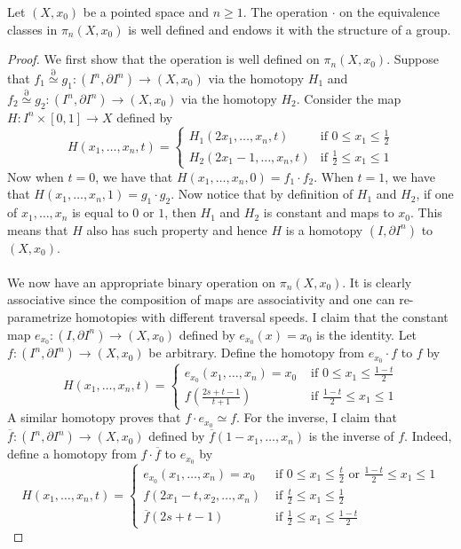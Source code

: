 \documentclass[a4paper]{article}
\begin{document}
\begin{thm}{}{} Let $(X,x_0)$ be a pointed space and $n\geq 1$. The operation $\cdot$ on the equivalence classes in $\pi_n(X,x_0)$ is well defined and endows it with the structure of a group. \tcbline
\begin{proof}
We first show that the operation is well defined on $\pi_n(X,x_0)$. Suppose that $f_1\overset{\partial}{\simeq} g_1:(I^n,\partial I^n)\to(X,x_0)$ via the homotopy $H_1$ and $f_2\overset{\partial}{\simeq} g_2:(I^n,\partial I^n)\to(X,x_0)$ via the homotopy $H_2$. Consider the map $H:I^n\times[0,1]\to X$ defined by $$H(x_1,\dots,x_n,t)=\begin{cases}
H_1(2x_1,\dots,x_n,t) & \text{if } 0\leq x_1\leq\frac{1}{2}\\
H_2(2x_1-1,\dots,x_n,t) & \text{if }\frac{1}{2}\leq x_1\leq 1
\end{cases}$$ 
Now when $t=0$, we have that $H(x_1,\dots,x_n,0)=f_1\cdot f_2$. When $t=1$, we have that $H(x_1,\dots,x_n,1)=g_1\cdot g_2$. Now notice that by definition of $H_1$ and $H_2$, if one of $x_1,\dots,x_n$ is equal to $0$ or $1$, then $H_1$ and $H_2$ is constant and maps to $x_0$. This means that $H$ also has such property and hence $H$ is a homotopy $(I,\partial I^n)$ to $(X,x_0)$. \\~\\

We now have an appropriate binary operation on $\pi_n(X,x_0)$. It is clearly associative since the composition of maps are associativity and one can re-parametrize homotopies with different traversal speeds. I claim that the constant map $e_{x_0}:(I,\partial I^n)\to(X,x_0)$ defined by $e_{x_0}(x)=x_0$ is the identity. Let $f:(I^n,\partial I^n)\to(X,x_0)$ be arbitrary. Define the homotopy from $e_{x_0}\cdot f$ to $f$ by $$H(x_1,\dots,x_n,t)=\begin{cases}
e_{x_0}(x_1,\dots,x_n)=x_0 & \text{ if }0\leq x_1\leq\frac{1-t}{2}\\
f\left(\frac{2s+t-1}{t+1}\right) & \text{ if }\frac{1-t}{2}\leq x_1\leq 1
\end{cases}$$ A similar homotopy proves that $f\cdot e_{x_0}\simeq f$. For the inverse, I claim that $\overline{f}:(I^n,\partial I^n)\to(X,x_0)$ defined by $\overline{f}(1-x_1,\dots,x_n)$ is the inverse of $f$. Indeed, define a homotopy from $f\cdot\overline{f}$ to $e_{x_0}$ by $$H(x_1,\dots,x_n,t)=\begin{cases}
e_{x_0}(x_1,\dots,x_n)=x_0 & \text{ if }0\leq x_1\leq\frac{t}{2}\text{ or }\frac{1-t}{2}\leq x_1\leq 1\\
f(2x_1-t,x_2,\dots,x_n) & \text{ if }\frac{t}{2}\leq x_1\leq\frac{1}{2}\\
\overline{f}(2s+t-1) & \text{ if }\frac{1}{2}\leq x_1\leq\frac{1-t}{2}
\end{cases}$$
\end{proof}
\end{thm}
\end{document}
